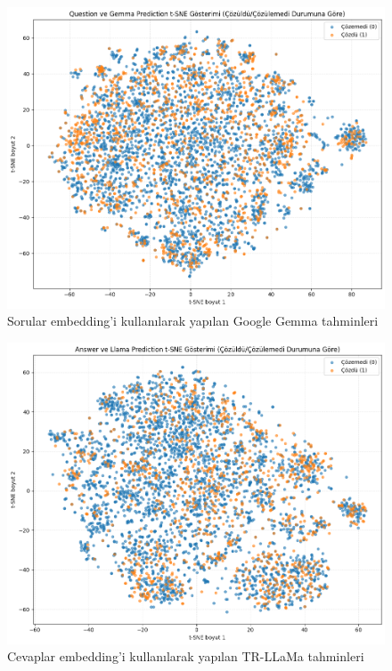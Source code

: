 \documentclass[conference]{IEEEtran}
\begin{document}
\begin{figure}[htbp]
\centering
\includegraphics[width=1\linewidth]{q-g.png}
\caption{Sorular embedding'i kullanılarak yapılan Google Gemma tahminleri}
\label{fig}
\end{figure}

\begin{figure}[htbp]
\centering
\includegraphics[width=1\linewidth]{a-l.png}
\caption{Cevaplar embedding'i kullanılarak yapılan TR-LLaMa tahminleri}
\label{fig}
\end{figure}
\end{document}
